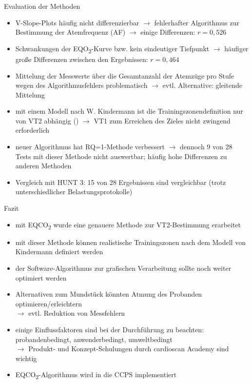 \documentclass[colorBG,slideColor,8pt]{beamer}
\newcommand{\eqotwo}{EQO\textsubscript{2}}
\newcommand{\eqcotwo}{EQCO\textsubscript{2}}
\begin{document}
\begin{frame}{Evaluation der Methoden}
\begin{itemize}
	\item V-Slope-Plots häufig nicht differenzierbar $\rightarrow$ fehlerhafter Algorithmus zur Bestimmung der Atemfrequenz (AF) $\rightarrow$ einige Differenzen: $r = 0,526$
	\item Schwankungen der \eqotwo-Kurve bzw. kein eindeutiger Tiefpunkt $\rightarrow$ häufiger große Differenzen zwischen den Ergebnissen: $r = 0,464$
	\item Mittelung der Messwerte über die Gesamtanzahl der Atemzüge pro Stufe wegen des Algorithmusfehlers problematisch $\rightarrow$ evtl. Alternative: gleitende Mittelung
	\item mit einem Modell nach W. Kindermann ist die Trainingszonendefinition nur von VT2 abhängig (\cite{Kindermann.2004}) $\rightarrow$ VT1 zum Erreichen des Zieles nicht zwingend erforderlich
	\item neuer Algorithmus hat RQ=1-Methode verbessert $\rightarrow$ dennoch 9 von 28 Tests mit dieser Methode nicht auswertbar; häufig hohe Differenzen zu anderen Methoden
	\item Vergleich mit HUNT 3: 15 von 28 Ergebnissen sind vergleichbar (trotz unterschiedlicher Belastungsprotokolle)
\end{itemize}
\end{frame}

\begin{frame}{Fazit}
\begin{itemize}
	\item mit \eqcotwo{} wurde eine genauere Methode zur VT2-Bestimmung erarbeitet
	\item mit dieser Methode können realistische Trainingszonen nach dem Modell von Kindermann definiert werden
	\item der Software-Algorithmus zur grafischen Verarbeitung sollte noch weiter optimiert werden
	\item Alternativen zum Mundstück könnten Atmung des Probanden optimieren/erleichtern\\$\rightarrow$ evtl. Reduktion von Messfehlern
	\item einige Einflussfaktoren sind bei der Durchführung zu beachten: probandenbedingt, anwenderbedingt, umweltbedingt\\$\rightarrow$ Produkt- und Konzept-Schulungen durch cardioscan Academy sind wichtig
	\item \eqcotwo-Algorithmus wird in die CCPS implementiert
\end{itemize}
\end{frame}
\end{document}
